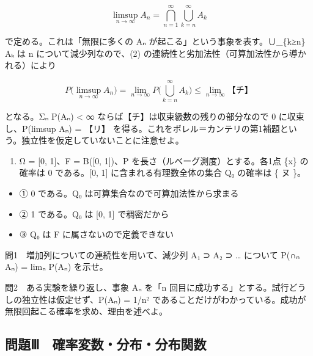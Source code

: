 \documentclass[
  10pt,
  a4paper,
]{article}
\providecommand{\tightlist}{%
  \setlength{\itemsep}{0pt}\setlength{\parskip}{0pt}}
\begin{document}
\[\limsup_{n\to\infty} A_n = \bigcap_{n=1}^{\infty} \bigcup_{k=n}^{\infty} A_k\]

で定める。これは「無限に多くの A{\fallbackfont ₙ}
が起こる」という事象を表す。∪\_\{k≥n\} A{\fallbackfont ₖ} は n
について減少列なので、(2)
の連続性と劣加法性（可算加法性から導かれる）により

\[P\Big(\limsup_{n\to\infty} A_n\Big) = \lim_{n\to\infty} P\Big(\bigcup_{k=n}^{\infty} A_k\Big) \le \lim_{n\to\infty} \text{【チ】}\]

となる。Σ{\fallbackfont ₙ} P(A{\fallbackfont ₙ}) \textless{} ∞
ならば【チ】は収束級数の残りの部分なので 0 に収束し、P(limsup
A{\fallbackfont ₙ}) = 【リ】
を得る。これをボレル＝カンテリの第1補題という。独立性を仮定していないことに注意せよ。

\begin{enumerate}
\def\labelenumi{(\arabic{enumi})}
\setcounter{enumi}{3}
\tightlist
\item
  Ω = {[}0, 1{]}、F = B({[}0, 1{]})、P
  を長さ（ルベーグ測度）とする。各1点 \{x\} の確率は 0 である。{[}0,
  1{]} に含まれる有理数全体の集合 Q{\fallbackfont ₀} の確率は \{ ヌ \}。
\end{enumerate}

\begin{itemize}
\tightlist
\item
  ① 0 である。Q{\fallbackfont ₀} は可算集合なので可算加法性から求まる
\item
  ② 1 である。Q{\fallbackfont ₀} は {[}0, 1{]} で稠密だから
\item
  ③ Q{\fallbackfont ₀} は F に属さないので定義できない
\end{itemize}

問1　増加列についての連続性を用いて、減少列 A{\fallbackfont ₁} ⊃
A{\fallbackfont ₂} ⊃ \ldots{} について P(∩{\fallbackfont ₙ}
A{\fallbackfont ₙ}) = lim{\fallbackfont ₙ} P(A{\fallbackfont ₙ})
を示せ。

問2　ある実験を繰り返し、事象 A{\fallbackfont ₙ} を「n
回目に成功する」とする。試行どうしの独立性は仮定せず、P(A{\fallbackfont ₙ})
= 1/n²
であることだけがわかっている。成功が無限回起こる確率を求め、理由を述べよ。

\hypertarget{ux554fux984cux2172-ux78baux7387ux5909ux6570ux5206ux5e03ux5206ux5e03ux95a2ux6570}{%
\subsection{問題Ⅲ　確率変数・分布・分布関数}\label{ux554fux984cux2172-ux78baux7387ux5909ux6570ux5206ux5e03ux5206ux5e03ux95a2ux6570}}
\end{document}
